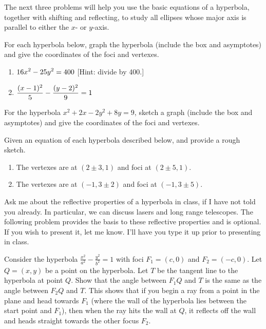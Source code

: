 The next three problems will help you use the basic equations of a hyperbola, together with shifting and reflecting, to study all ellipses whose major axis is parallel to either the $x$- or $y$-axis. 

\begin{problem} 
For each hyperbola below, graph the hyperbola (include the box and asymptotes) and give the coordinates of the foci and vertexes. 
\begin{enumerate}
\item $\displaystyle 16x^2-25y^2=400$ [Hint: divide by 400.]
\item $\displaystyle \frac{(x-1)^2}{5}-\frac{(y-2)^2}{9}=1$
\end{enumerate}
\end{problem}

\begin{problem}
For the hyperbola $x^2+2x-2y^2+8y=9$, sketch a graph (include the box and asymptotes) and give the coordinates of the foci and vertexes. 
\end{problem}

\begin{problem} 
Given an equation of each hyperbola described below, and provide a rough sketch.
\begin{enumerate}
\item The vertexes are at $(2\pm 3,1)$ and foci at $(2\pm 5, 1)$.
\item The vertexes are at $(-1,3\pm 2)$ and foci at $(-1, 3\pm 5)$.
\end{enumerate}
\end{problem}

Ask me about the reflective properties of a hyperbola in class, if I have not told you already. In particular, we can discuss lasers and long range telescopes. The following problem provides the basis to these reflective properties and is optional.  If you wish to present it, let me know. I'll have you type it up prior to presenting in class.

\begin{problem*}[Optional]
Consider the hyperbola $\frac{x^2}{a^2}-\frac{y^2}{b^2}=1$ with foci $F_1=(c,0)$ and $F_2=(-c,0)$. 
Let $Q=(x,y)$ be a point on the hyperbola. 
Let $T$ be the tangent line to the hyperbola at point $Q$. 
Show that the angle between $F_1Q$ and $T$ is the same as the angle between $F_2Q$ and $T$. This shows that if you begin a ray from a point in the plane and head towards $F_1$ (where the wall of the hyperbola lies between the start point and $F_1$), then when the ray hits the wall at $Q$, it reflects off the wall and heads straight towards the other focus $F_2$.
\end{problem*}

